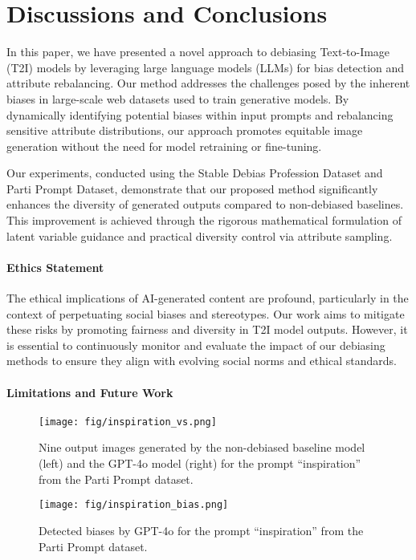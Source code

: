 \section{Discussions and Conclusions}
\label{sec:conclusion}
In this paper, we have presented a novel approach to debiasing Text-to-Image (T2I) models by leveraging large language models (LLMs) for bias detection and attribute rebalancing. Our method addresses the challenges posed by the inherent biases in large-scale web datasets used to train generative models. By dynamically identifying potential biases within input prompts and rebalancing sensitive attribute distributions, our approach promotes equitable image generation without the need for model retraining or fine-tuning.

Our experiments, conducted using the Stable Debias Profession Dataset and Parti Prompt Dataset, demonstrate that our proposed method significantly enhances the diversity of generated outputs compared to non-debiased baselines. This improvement is achieved through the rigorous mathematical formulation of latent variable guidance and practical diversity control via attribute sampling.

\paragraph{Ethics Statement} 
The ethical implications of AI-generated content are profound, particularly in the context of perpetuating social biases and stereotypes. Our work aims to mitigate these risks by promoting fairness and diversity in T2I model outputs. However, it is essential to continuously monitor and evaluate the impact of our debiasing methods to ensure they align with evolving social norms and ethical standards.

\paragraph{Limitations and Future Work} 
\begin{figure}[tbp]
    \centering
    \texttt{[image: fig/inspiration\_vs.png]}
    \caption{Nine output images generated by the non-debiased baseline model (left) and the GPT-4o model (right) for the prompt ``inspiration'' from the Parti Prompt dataset.}
    \label{fig:inspiration_comp}
\end{figure}
\begin{figure}[tbp]
    \centering
    \texttt{[image: fig/inspiration\_bias.png]}
    \caption{Detected biases by GPT-4o for the prompt ``inspiration'' from the Parti Prompt dataset.}
    \label{fig:inspiration_bias}
\end{figure}

